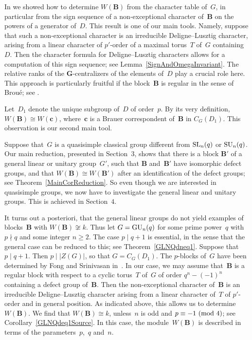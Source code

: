 \documentclass[12pt]{amsart}
\newcommand{\bG}{{\mathbf{G}}}      %
\newcommand{\bB}{{\mathbf{B}}}
\newcommand{\bc}{{\mathbf{c}}}
\def\GU{ \text{\rm GU} }
\def\SL{ \text{\rm SL} }
\def\SU{ \text{\rm SU} }
\theoremstyle{theorem}
\theoremstyle{definition}
\theoremstyle{remark}
\begin{document}
In \cite[Section~$3$]{HL24} we showed how to determine $W(\bB)$ from the
character table of~$G$, in particular from the sign sequence of a 
non-exceptional character of~$\bB$ on the powers of a generator of~$D$. This 
result is one of our main tools. Namely, suppose that such a non-exceptional 
character is an irreducible Deligne--Lusztig character, arising from a linear
character of $p'$-order of a maximal torus~$T$ of~$G$ containing~$D$. Then the 
character formula for Deligne--Lusztig characters allows for a computation of 
this sign sequence; see Lemma~\ref{SignAndOmegaInvariant}. The relative ranks of 
the $\bG$-centralizers of the elements of~$D$ play a crucial role here. This 
approach is particularly fruitful if the block~$\bB$ is regular in the sense of 
Brou{\'e}; see \cite[Th{\'e}o\-r{\`e}\-me~$3.1$]{brouMo}.

Let~$D_1$ denote the unique subgroup of~$D$ of order~$p$. By its very 
definition, $W( \bB ) \cong W( \bc )$, where~$\bc$ is a Brauer correspondent 
of~$\bB$ in $C_G( D_1 )$. This observation is our second main tool.

Suppose that~$G$ is a quasisimple classical group different from $\SL_n( q )$
or $\SU_n(q)$. Our main reduction, presented in Section~$3$, shows that there is 
a block ${\bB}'$ of a general linear or unitary group~${G}'$, such that $\bB$ 
and~${\bB}'$ have isomorphic defect groups, and that 
$W( \bB ) \cong W( {\bB}' )$ after an identification of the defect groups; see 
Theorem~\ref{MainCorReduction}. So even though we are interested in 
quasisimple groups, we now have to investigate the general linear and unitary 
groups. This is achieved in Section~$4$.

It turns out a posteriori, that the general linear groups do not yield examples 
of blocks~$\bB$ with $W( \bB ) \not\cong k$. Thus let $G = \GU_n( q )$ for
some prime power~$q$ with $p \nmid q$ and some integer $n \geq 2$. The case 
$p \mid q + 1$ is essential, in the sense that the general case can be reduced 
to this; see Theorem~\ref{GLNQdneq1}. Suppose that $p \mid q + 1$. Then 
$p \mid |Z(G)|$, so that $G = C_G( D_1 )$. The $p$-blocks of~$G$ have been 
determined by Fong and Srinivasan in~\cite{fs2}. In our case, we may assume 
that~$\bB$ is a regular block with respect to a cyclic torus~$T$ of~$G$ of order 
$q^n - (-1)^n$ containing a defect group of~$\bB$. Then the non-exceptional 
character of~$\bB$ is an irreducible Deligne--Lusztig character arising from a 
linear character of~$T$ of $p'$-order and in general position. As indicated 
above, this allows us to determine~$W( \bB )$. We find that $W(\bB) \cong k$, 
unless~$n$ is odd and $p \equiv -1\,\,(\mbox{\rm mod}\,\,4)$; see 
Corollary~\ref{GLNQdeq1Source}. In this case, the module~$W(\bB)$ is described 
in terms of the parameters~$p$,~$q$ and~$n$.
\end{document}
